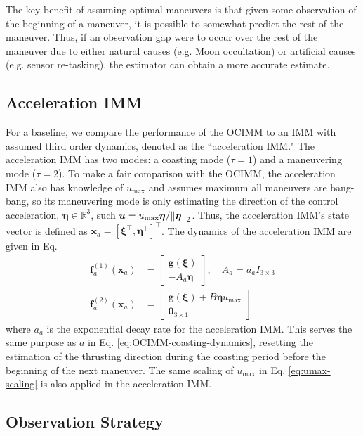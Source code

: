 \documentclass[letterpaper, preprint, paper,11pt]{AAS}	%
\newcommand{\R}{\mathbb{R}}
\begin{document}
The key benefit of assuming optimal maneuvers is that given some observation of the beginning of a maneuver, it is possible to somewhat predict the rest of the maneuver. Thus, if an observation gap were to occur over the rest of the maneuver due to either natural causes (e.g. Moon occultation) or artificial causes (e.g. sensor re-tasking), the estimator can obtain a more accurate estimate. 

\subsection{Acceleration IMM}

For a baseline, we compare the performance of the OCIMM to an IMM with assumed third order dynamics, denoted as the ``acceleration IMM." The acceleration IMM has two modes: a coasting mode ($\tau = 1$) and a maneuvering mode ($\tau = 2$). To make a fair comparison with the OCIMM, the acceleration IMM also has knowledge of $u_\text{max}$ and assumes maximum all maneuvers are bang-bang, so its maneuvering mode is only estimating the direction of the control acceleration, $\bm{\eta} \in \R^3$, such $\bm{u} = u_\text{max} \bm{\eta}/\norm{\bm{\eta}}_2 $. Thus, the acceleration IMM's state vector is defined as $\bm{x}_a = [\bm{\xi}^\top, \bm{\eta}^\top]^\top$. The dynamics of the acceleration IMM are given in Eq. 
\begin{align}
    \bm{f}^{(1)}_a (\bm{x}_a) &= \begin{bmatrix}
        \bm{g}(\bm{\xi}) \\
        -A_a \bm{\eta}
    \end{bmatrix}, \quad A_a = a_a I_{3 \times 3} \\
    \bm{f}^{(2)}_a (\bm{x}_a) &= \begin{bmatrix}
        \bm{g}(\bm{\xi}) + B \bm{\eta}u_\text{max} \\
        \bm{0}_{3 \times 1}
    \end{bmatrix}
\end{align}
where $a_a$ is the exponential decay rate for the acceleration IMM. This serves the same purpose as $a$ in Eq. \ref{eq:OCIMM-coasting-dynamics}, resetting the estimation of the thrusting direction during the coasting period before the beginning of the next maneuver. The same scaling of $u_\text{max}$ in Eq. \ref{eq:umax-scaling} is also applied in the acceleration IMM.

\subsection{Observation Strategy}
\end{document}

